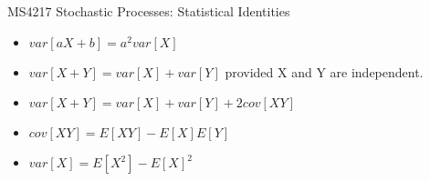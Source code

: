 MS4217 Stochastic Processes: Statistical Identities

\begin{itemize}
\item $ var[aX+b] =a^2var[X]$

\item $ var[X+Y] =var[X] +var[Y] $ provided X and Y are independent.

\item $ var[X+Y] =var[X] +var[Y] + 2cov[XY]  $

\item $ cov[XY] = E[XY] - E[X]E[Y]$

\item $ var[X] =E[X^2] -E[X]^2$
\end{itemize}
